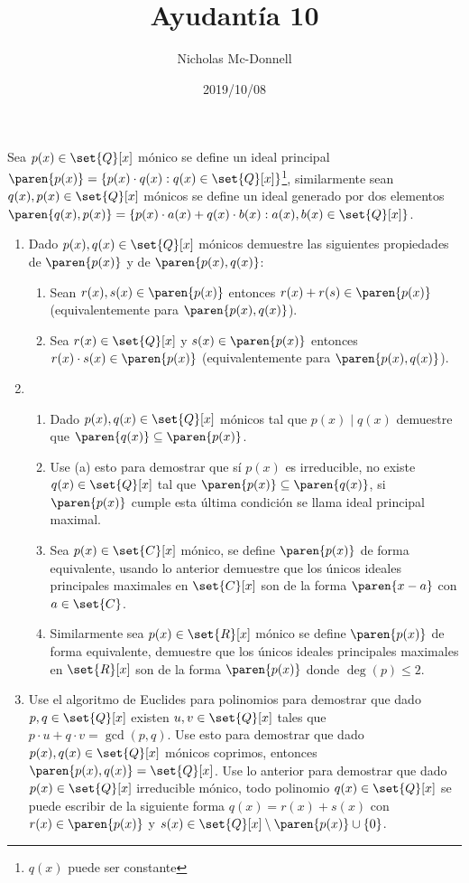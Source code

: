 \documentclass{ayudantia}
\title{Ayudantía 10}
\date{2019/10/08}
\author{Nicholas Mc-Donnell}
\begin{document}
\maketitle
Sea \(p(x)\in\set{Q}[x]\) mónico se define un ideal principal \(\paren{p(x)}=\{p(x)\cdot q(x):q(x)\in\set{Q}[x]\}\)\footnote{\(q(x)\) puede ser constante}, similarmente sean \(q(x),p(x)\in\set{Q}[x]\) mónicos se define un ideal generado por dos elementos \(\paren{q(x),p(x)}=\{p(x)\cdot a(x)+q(x)\cdot b(x):a(x),b(x)\in\set{Q}[x]\}\).
\begin{enumerate}
    \item Dado \(p(x),q(x)\in\set{Q}[x]\) mónicos demuestre las siguientes propiedades de \(\paren{p(x)}\) y de \(\paren{p(x),q(x)}\):
    \begin{enumerate}[label=(\alph*)]
        \item Sean \(r(x),s(x)\in\paren{p(x)}\) entonces \(r(x)+r(s)\in\paren{p(x)}\) (equivalentemente para \(\paren{p(x),q(x)}\)).
        \item Sea \(r(x)\in\set{Q}[x]\) y \(s(x)\in\paren{p(x)}\) entonces \(r(x)\cdot s(x)\in\paren{p(x)}\) (equivalentemente para \(\paren{p(x),q(x)}\)).
    \end{enumerate}
    \item 
    \begin{enumerate}[label=(\alph*)]
        \item Dado \(p(x),q(x)\in\set{Q}[x]\) mónicos tal que \(p(x)\mid q(x)\) demuestre que \(\paren{q(x)}\subseteq\paren{p(x)}\). 
        \item Use (a) esto para demostrar que sí \(p(x)\) es irreducible, no existe \(q(x)\in\set{Q}[x]\) tal que \(\paren{p(x)}\subseteq\paren{q(x)}\), si \(\paren{p(x)}\) cumple esta última condición se llama ideal principal maximal.
        \item Sea \(p(x)\in\set{C}[x]\) mónico, se define \(\paren{p(x)}\) de forma equivalente, usando lo anterior demuestre que los únicos ideales principales maximales en \(\set{C}[x]\) son de la forma \(\paren{x-a}\) con \(a\in\set{C}\). 
        \item Similarmente sea \(p(x)\in\set{R}[x]\) mónico se define \(\paren{p(x)}\) de forma equivalente, demuestre que los únicos ideales principales maximales en \(\set{R}[x]\) son de la forma \(\paren{p(x)}\) donde \(\deg(p)\leq 2\).
    \end{enumerate}
    \item Use el algoritmo de Euclides para polinomios para demostrar que dado \(p,q\in\set{Q}[x]\) existen \(u,v\in\set{Q}[x]\) tales que \(p\cdot u+q\cdot v=\gcd(p,q)\). Use esto para demostrar que dado \(p(x),q(x)\in\set{Q}[x]\) mónicos coprimos, entonces \(\paren{p(x),q(x)}=\set{Q}[x]\). Use lo anterior para demostrar que dado \(p(x)\in\set{Q}[x]\) irreducible mónico, todo polinomio \(q(x)\in\set{Q}[x]\) se puede escribir de la siguiente forma \(q(x)=r(x)+s(x)\) con \(r(x)\in\paren{p(x)}\) y \(s(x)\in\set{Q}[x]\setminus\paren{p(x)}\cup\{0\}\).
\end{enumerate}
\end{document}
